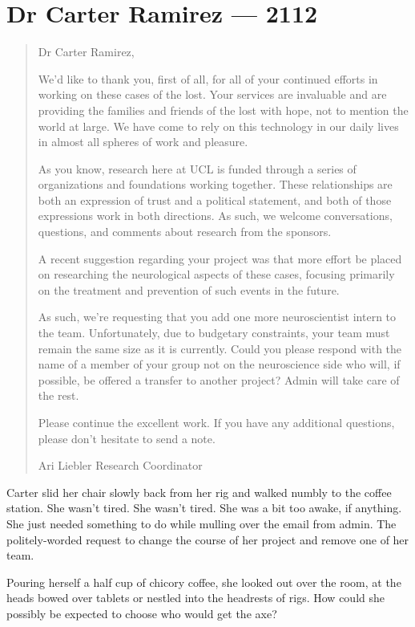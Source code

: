 \hypertarget{dr-carter-ramirez-2112}{%
\chapter*{Dr Carter Ramirez — 2112}\label{dr-carter-ramirez-2112}}

\begin{quote}
Dr Carter Ramirez,

We'd like to thank you, first of all, for all of your continued efforts in working on these cases of the lost. Your services are invaluable and are providing the families and friends of the lost with hope, not to mention the world at large. We have come to rely on this technology in our daily lives in almost all spheres of work and pleasure.

As you know, research here at UCL is funded through a series of organizations and foundations working together. These relationships are both an expression of trust and a political statement, and both of those expressions work in both directions. As such, we welcome conversations, questions, and comments about research from the sponsors.

A recent suggestion regarding your project was that more effort be placed on researching the neurological aspects of these cases, focusing primarily on the treatment and prevention of such events in the future.

As such, we're requesting that you add one more neuroscientist intern to the team. Unfortunately, due to budgetary constraints, your team must remain the same size as it is currently. Could you please respond with the name of a member of your group not on the neuroscience side who will, if possible, be offered a transfer to another project? Admin will take care of the rest.

Please continue the excellent work. If you have any additional questions, please don't hesitate to send a note.

Ari Liebler Research Coordinator
\end{quote}

Carter slid her chair slowly back from her rig and walked numbly to the coffee station. She wasn't tired. She wasn't tired. She was a bit too awake, if anything. She just needed something to do while mulling over the email from admin. The politely-worded request to change the course of her project and remove one of her team.

Pouring herself a half cup of chicory coffee, she looked out over the room, at the heads bowed over tablets or nestled into the headrests of rigs. How could she possibly be expected to choose who would get the axe?

